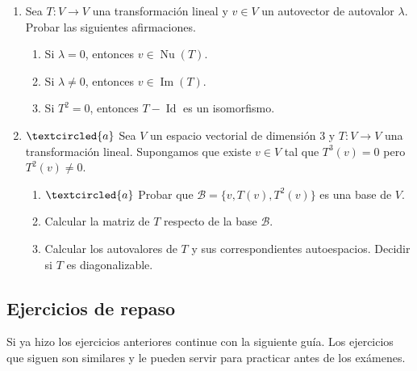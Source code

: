 \begin{enumerate}[topsep=6pt, itemsep=.4cm]
\item Sea $T:V\longrightarrow V$ una transformación lineal y $v\in V$ un autovector de autovalor $\lambda$. Probar las siguientes afirmaciones.
\begin{enumerate}
    \item\label{autovalor-autovector-a} Si $\lambda=0$, entonces $v\in\operatorname{Nu}(T)$.
    \item\label{autovalor-autovector-b} Si $\lambda\neq0$, entonces $v\in\operatorname{Im}(T)$.
    \item\label{autovalor-autovector-c} Si $T^2=0$, entonces $T-\operatorname{Id}$ es un isomorfismo.
\end{enumerate}


\item\label{base nilp} $\textcircled{a}$ Sea $V$ un espacio vectorial de dimensión $3$ y $T:V\longrightarrow V$ una transformación lineal. Supongamos que existe $v\in V$ tal que $T^3(v)=0$ pero $T^2(v)\neq0$.
\begin{enumerate}
    \item\label{base nilp a} $\textcircled{a}$ Probar que $\mathcal{B}=\{v,T(v),T^2(v)\}$ es una base de $V$.
    \item\label{base nilp b} Calcular la matriz de $T$ respecto de la base $\mathcal{B}$.
    \item\label{base nilp c} Calcular los autovalores de $T$ y sus correspondientes autoespacios. Decidir si $T$ es diagonalizable.
\end{enumerate}




\end{enumerate}


\subsection*{Ejercicios de repaso}
Si ya hizo los ejercicios anteriores continue con la siguiente guía. Los ejercicios que siguen son similares y le pueden servir para practicar antes de los exámenes.

